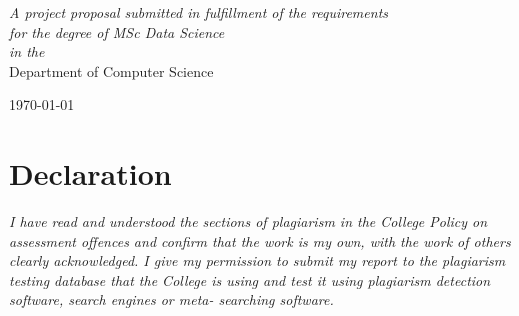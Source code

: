 \documentclass[12pt, twoside, a4paper]{article}
\begin{document}
\begin{titlepage}
\begin{center}
            \large \textit{A project proposal submitted in fulfillment of the requirements\\ for the degree of MSc Data Science}\\[0.3cm] %
            \textit{in the}\\[0.4cm]
            Department of Computer Science\\[2cm] %
 
            \vfill

            {\large \today}\\[4cm] %
 
            \vfill
    \end{center}
\end{titlepage}    
\thispagestyle{empty}
\cleardoublepage


\section*{Declaration}

\vfill
\textit{I have read and understood the sections of plagiarism in the College Policy on assessment offences and confirm that the work is my own, with the work of others clearly acknowledged. I give my permission to submit my report to the plagiarism testing database that the College is using and test it using plagiarism detection software, search engines or meta- searching software.}
\vfill

\clearpage
\end{document}
